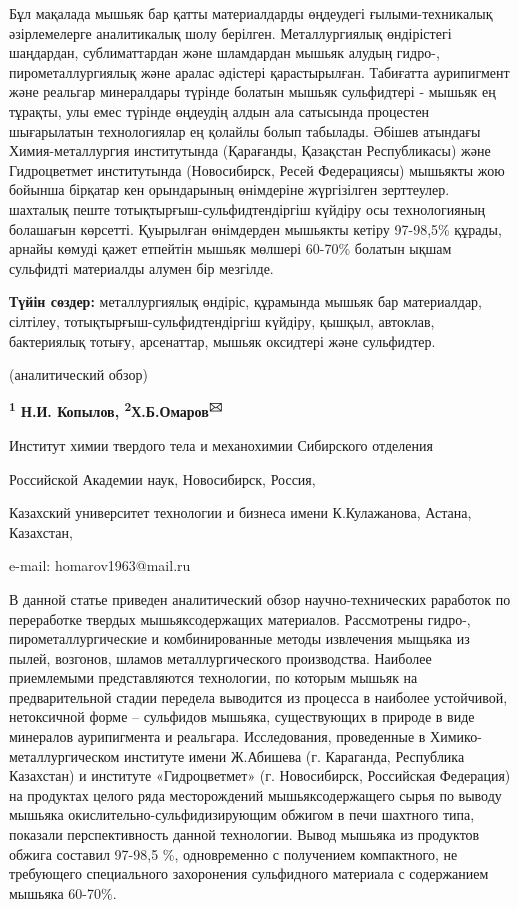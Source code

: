 Бұл мақалада мышьяк бар қатты материалдарды өңдеудегі ғылыми-техникалық
әзірлемелерге аналитикалық шолу берілген. Металлургиялық өндірістегі
шаңдардан, сублиматтардан және шламдардан мышьяк алудың гидро-,
пирометаллургиялық және аралас әдістері қарастырылған. Табиғатта
аурипигмент және реальгар минералдары түрінде болатын мышьяк сульфидтері
- мышьяк ең тұрақты, улы емес түрінде өңдеудің алдын ала сатысында
процестен шығарылатын технологиялар ең қолайлы болып табылады. Әбішев
атындағы Химия-металлургия институтында (Қарағанды, Қазақстан
Республикасы) және Гидроцветмет институтында (Новосибирск, Ресей
Федерациясы) мышьякты жою бойынша бірқатар кен орындарының өнімдеріне
жүргізілген зерттеулер. шахталық пеште тотықтырғыш-сульфидтендіргіш
күйдіру осы технологияның болашағын көрсетті. Қуырылған өнімдерден
мышьякты кетіру 97-98,5\% құрады, арнайы көмуді қажет етпейтін мышьяк
мөлшері 60-70\% болатын ықшам сульфидті материалды алумен бір мезгілде.

{\bfseries Түйін сөздер:} металлургиялық өндіріс, құрамында мышьяк бар
материалдар, сілтілеу, тотықтырғыш-сульфидтендіргіш күйдіру, қышқыл,
автоклав, бактериялық тотығу, арсенаттар, мышьяк оксидтері және
сульфидтер.


\begin{center}
(аналитический обзор)

{\bfseries \textsuperscript{1} Н.И. Копылов,
\textsuperscript{2}Х.Б.Омаров\textsuperscript{🖂 }}

Институт химии твердого тела и механохимии Сибирского отделения

Российской Академии наук, Новосибирск, Россия,

Казахский университет технологии и бизнеса имени К.Кулажанова, Астана,
Казахстан,

e-mail: homarov1963@mail.ru
\end{center}

В данной статье приведен аналитический обзор научно-технических
раработок по переработке твердых мышьяксодержащих материалов.
Рассмотрены гидро-, пирометаллургические и комбинированные методы
извлечения мыщьяка из пылей, возгонов, шламов металлургического
производства. Наиболее приемлемыми представляются технологии, по которым
мышьяк на предварительной стадии передела выводится из процесса в
наиболее устойчивой, нетоксичной форме -- сульфидов мышьяка,
существующих в природе в виде минералов аурипигмента и реальгара.
Исследования, проведенные в Химико-металлургическом институте имени
Ж.Абишева (г. Караганда, Республика Казахстан) и институте
«Гидроцветмет» (г. Новосибирск, Российская Федерация) на продуктах
целого ряда месторождений мышьяксодержащего сырья по выводу мышьяка
окислительно-сульфидизирующим обжигом в печи шахтного типа, показали
перспективность данной технологии. Вывод мышьяка из продуктов обжига
составил 97-98,5 \%, одновременно с получением компактного, не
требующего специального захоронения сульфидного материала с содержанием
мышьяка 60-70\%.

